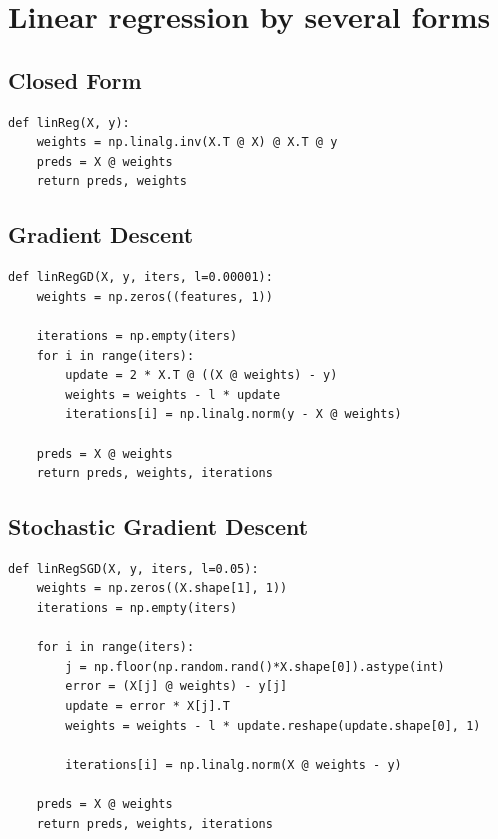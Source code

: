\section{Linear regression by several forms}
\subsection{Closed Form}

\begin{listing}[H]
    \begin{verbatim}
def linReg(X, y):
    weights = np.linalg.inv(X.T @ X) @ X.T @ y
    preds = X @ weights
    return preds, weights
    \end{verbatim}
\end{listing}

\subsection{Gradient Descent}

\begin{listing}[H]
    \begin{verbatim}
def linRegGD(X, y, iters, l=0.00001):
    weights = np.zeros((features, 1))
    
    iterations = np.empty(iters)
    for i in range(iters):
        update = 2 * X.T @ ((X @ weights) - y)
        weights = weights - l * update
        iterations[i] = np.linalg.norm(y - X @ weights)
    
    preds = X @ weights
    return preds, weights, iterations
    \end{verbatim}
\end{listing}

\subsection{Stochastic Gradient Descent}

\begin{listing}[H]
    \begin{verbatim}
def linRegSGD(X, y, iters, l=0.05):
    weights = np.zeros((X.shape[1], 1))
    iterations = np.empty(iters)
    
    for i in range(iters):  
        j = np.floor(np.random.rand()*X.shape[0]).astype(int)
        error = (X[j] @ weights) - y[j]
        update = error * X[j].T
        weights = weights - l * update.reshape(update.shape[0], 1)
      
        iterations[i] = np.linalg.norm(X @ weights - y)
        
    preds = X @ weights
    return preds, weights, iterations
    \end{verbatim}
\end{listing}

